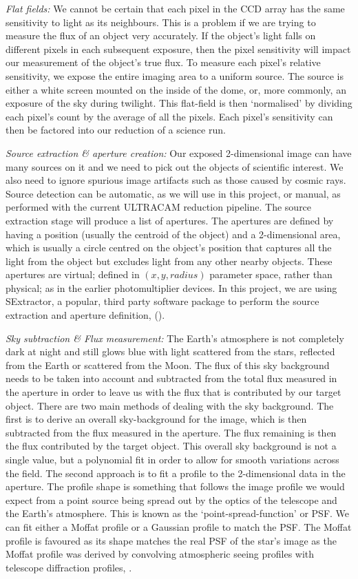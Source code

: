 \emph{Flat fields:}
We cannot be certain that each pixel in the CCD array has the same sensitivity to light as its neighbours. This is a problem if we are trying to measure the flux of an object very accurately. If the object's light falls on different pixels in each subsequent exposure, then the pixel sensitivity will impact our measurement of the object's true flux. To measure each pixel's relative sensitivity, we expose the entire imaging area to a uniform source. The source is either a white screen mounted on the inside of the dome, or, more commonly, an exposure of the sky during twilight. This flat-field is then `normalised' by dividing each pixel's count by the average of all the pixels. Each pixel's sensitivity can then be factored into our reduction of a science run. 

\emph{Source extraction \& aperture creation:}
Our exposed 2-dimensional image can have many sources on it and we need to pick out the objects of scientific interest. We also need to ignore spurious image artifacts such as those caused by cosmic rays. Source detection can be automatic, as we will use in this project, or manual, as performed with the current ULTRACAM reduction pipeline. The source extraction stage will produce a list of apertures. The apertures are defined by having a position (usually the centroid of the object) and a 2-dimensional area, which is usually a circle centred on the object's position that captures all the light from the object but excludes light from any other nearby objects. These apertures are virtual; defined in $(x, y, radius)$ parameter space, rather than physical; as in the earlier photomultiplier devices. In this project, we are using {SExtractor}, a popular, third party software package to perform the source extraction and aperture definition, (\cite{bertin}).

\emph{Sky subtraction \& Flux measurement:}
The Earth's atmosphere is not completely dark at night and still glows blue with light scattered from the stars, reflected from the Earth or scattered from the Moon. The flux of this sky background needs to be taken into account and subtracted from the total flux measured in the aperture in order to leave us with the flux that is contributed by our target object. There are two main methods of dealing with the sky background. The first is to derive an overall sky-background for the image, which is then subtracted from the flux measured in the aperture. The flux remaining is then the flux contributed by the target object. This overall sky background is not a single value, but a polynomial fit in order to allow for smooth variations across the field. The second approach is to fit a profile to the 2-dimensional data in the aperture. The profile shape is something that follows the image profile we would expect from a point source being spread out by the optics of the telescope and the Earth's atmosphere. This is known as the `point-spread-function' or {PSF}. We can fit either a Moffat profile or a Gaussian profile to match the PSF. The Moffat profile is favoured as its shape matches the real PSF of the star's image as the Moffat profile was derived by convolving atmospheric seeing profiles with telescope diffraction profiles, \citep{Moffat69}. 

